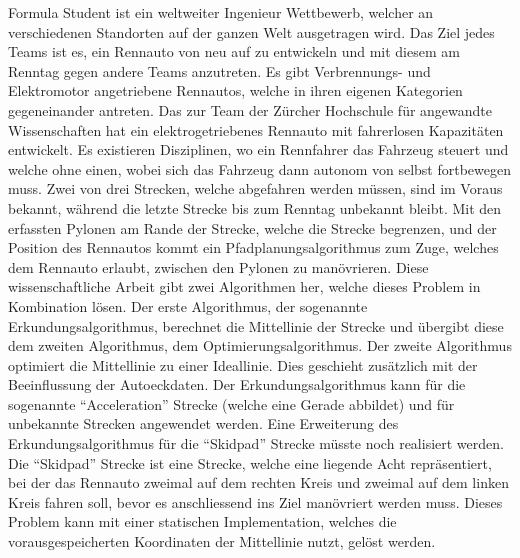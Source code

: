 Formula Student ist ein weltweiter Ingenieur Wettbewerb, welcher an verschiedenen Standorten auf der ganzen Welt ausgetragen wird. Das Ziel jedes Teams ist es, ein Rennauto von neu auf zu entwickeln und mit diesem am Renntag gegen andere Teams anzutreten. Es gibt Verbrennungs- und Elektromotor angetriebene Rennautos, welche in ihren eigenen Kategorien gegeneinander antreten. Das \acrlong{zur} Team der Zürcher Hochschule für angewandte Wissenschaften hat ein elektrogetriebenes Rennauto mit fahrerlosen Kapazitäten entwickelt. Es existieren Disziplinen, wo ein Rennfahrer das Fahrzeug steuert und welche ohne einen, wobei sich das Fahrzeug dann autonom von selbst fortbewegen muss. Zwei von drei Strecken, welche abgefahren werden müssen, sind im Voraus bekannt, während die letzte Strecke bis zum Renntag unbekannt bleibt. Mit den erfassten Pylonen am Rande der Strecke, welche die Strecke begrenzen, und der Position des Rennautos kommt ein Pfadplanungsalgorithmus zum Zuge, welches dem Rennauto erlaubt, zwischen den Pylonen zu manövrieren. Diese wissenschaftliche Arbeit gibt zwei Algorithmen her, welche dieses Problem in Kombination lösen. Der erste Algorithmus, der sogenannte Erkundungsalgorithmus, berechnet die Mittellinie der Strecke und übergibt diese dem zweiten Algorithmus, dem Optimierungsalgorithmus. Der zweite Algorithmus optimiert die Mittellinie zu einer Ideallinie. Dies geschieht zusätzlich mit der Beeinflussung der Autoeckdaten. Der Erkundungsalgorithmus kann für die sogenannte ``Acceleration'' Strecke (welche eine Gerade abbildet) und für unbekannte Strecken angewendet werden. Eine Erweiterung des Erkundungsalgorithmus für die ``Skidpad'' Strecke müsste noch realisiert werden. Die ``Skidpad'' Strecke ist eine Strecke, welche eine liegende Acht repräsentiert, bei der das Rennauto zweimal auf dem rechten Kreis und zweimal auf dem linken Kreis fahren soll, bevor es anschliessend ins Ziel manövriert werden muss. Dieses Problem kann mit einer statischen Implementation, welches die vorausgespeicherten Koordinaten der Mittellinie nutzt, gelöst werden.